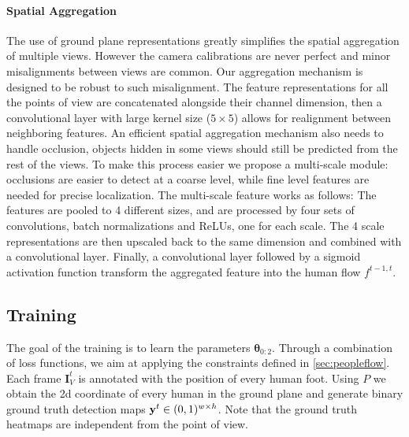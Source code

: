 \documentclass[10pt,twocolumn,letterpaper]{article}
\begin{document}
\paragraph{Spatial Aggregation} The use of ground plane representations greatly simplifies the spatial aggregation of multiple views. 
However the camera calibrations are never perfect and minor misalignments between views are common. Our aggregation mechanism is designed to be robust to such misalignment.
The feature representations for all the points of view are concatenated alongside their channel dimension, then a convolutional layer with large kernel size ($5 \times 5$) allows for realignment between neighboring features. 
An efficient spatial aggregation mechanism also needs to handle occlusion, objects hidden in some views should still be predicted from the rest of the views.
To make this process easier we propose a multi-scale module: occlusions are easier to detect at a coarse level, while fine level features are needed for precise localization.
The multi-scale feature works as follows: The features are pooled to 4 different sizes, and are processed by  four sets of convolutions, batch normalizations and ReLUs, one for each scale.
The 4 scale representations are then upscaled back to the same dimension and combined with a convolutional layer. 
Finally, a convolutional layer followed by a sigmoid activation function transform the aggregated feature into the human flow $f^{t-1, t}$.


\subsection{Training}

The goal of the training is to learn the parameters $\boldsymbol{\theta}_{0: 2}$. Through a combination of loss functions, we aim at applying the constraints defined in \cref{sec:peopleflow}.
Each frame $\mathbf{I}_V^{t}$ is annotated with the position of every human foot. Using $P$ we obtain the 2d coordinate of every human in the ground plane
 and generate binary ground truth detection maps $\mathbf{y}^t \in (0,1)^{w \times h}$. Note that the ground truth heatmaps are independent from the point of view.
\end{document}
